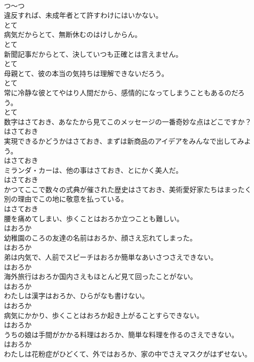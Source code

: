 \documentclass[8pt]{extreport}
\begin{document}
\begin{CJK}{UTF8}{min}
\\	つ～つ
\\	違反すれば、未成年者とて許すわけにはいかない。	
\\	とて
\\	病気だからとて、無断休むのはけしからん。	
\\	とて
\\	新聞記事だからとて、決していつも正確とは言えません。	
\\	とて
\\	母親とて、彼の本当の気持ちは理解できないだろう。	
\\	とて
\\	常に冷静な彼とてやはり人間だから、感情的になってしまうこともあるのだろう。	
\\	とて
\\	数字はさておき、あなたから見てこのメッセージの一番奇妙な点はどこですか？	
\\	はさておき
\\	実現できるかどうかはさておき、まずは新商品のアイデアをみんなで出してみよう。	
\\	はさておき
\\	ミランダ・カーは、他の事はさておき、とにかく美人だ。	
\\	はさておき
\\	かつてここで数々の式典が催された歴史はさておき、美術愛好家たちはまったく別の理由でこの地に敬意を払っている。	
\\	はさておき
\\	腰を痛めてしまい、歩くことはおろか立つことも難しい。	
\\	はおろか
\\	幼稚園のころの友達の名前はおろか、顔さえ忘れてしまった。	
\\	はおろか
\\	弟は内気で、人前でスピーチはおろか簡単なあいさつさえできない。	
\\	はおろか
\\	海外旅行はおろか国内さえもほとんど見て回ったことがない。	
\\	はおろか
\\	わたしは漢字はおろか、ひらがなも書けない。	
\\	はおろか
\\	病気にかかり、歩くことはおろか起き上がることすらできない。	
\\	はおろか
\\	うちの娘は手間がかかる料理はおろか、簡単な料理を作るのさえできない。	
\\	はおろか
\\	わたしは花粉症がひどくて、外ではおろか、家の中でさえマスクがはずせない。	

\end{CJK}
\end{document}
